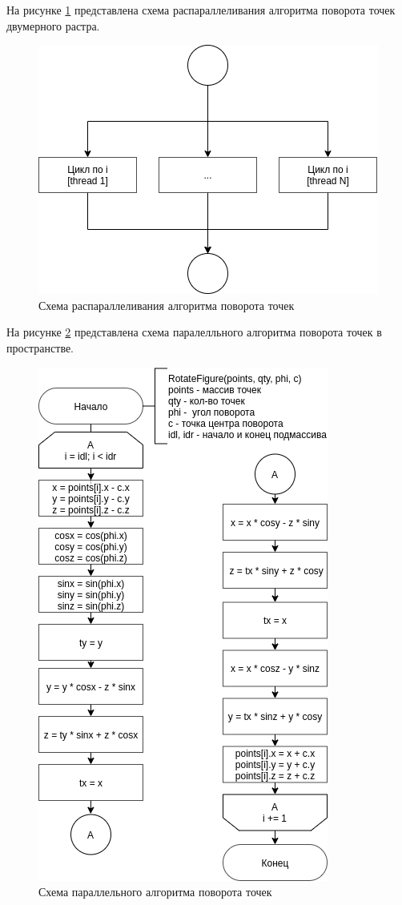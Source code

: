 На рисунке \ref{scheme:concur_abstr} представлена схема распараллеливания алгоритма
поворота точек двумерного растра.
\begin{figure}[!htb]
	\centering
	\includegraphics[scale=0.55]{schemes/concur_abstr}
	\caption{Схема распараллеливания алгоритма поворота точек}
	\label{scheme:concur_abstr}
\end{figure}


На рисунке \ref{scheme:concur} представлена схема паралелльного алгоритма
поворота точек в пространстве.
\begin{figure}[!htb]
	\centering
	\includegraphics[scale=0.58]{schemes/concur}
	\caption{Схема параллельного алгоритма поворота точек}
	\label{scheme:concur}
\end{figure}


